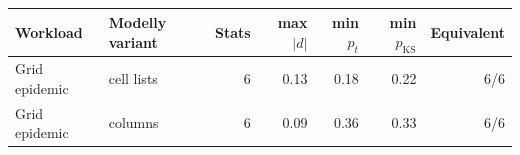\begin{tabular}{llrrrrr}
\toprule
Workload & Modelly variant & Stats & max $|d|$ & min $p_{t}$ & min $p_{\mathrm{KS}}$ & Equivalent \\
\midrule
Grid epidemic & cell lists & 6 & 0.13 & 0.18 & 0.22 & 6/6 \\
Grid epidemic & columns & 6 & 0.09 & 0.36 & 0.33 & 6/6 \\
\bottomrule
\end{tabular}
